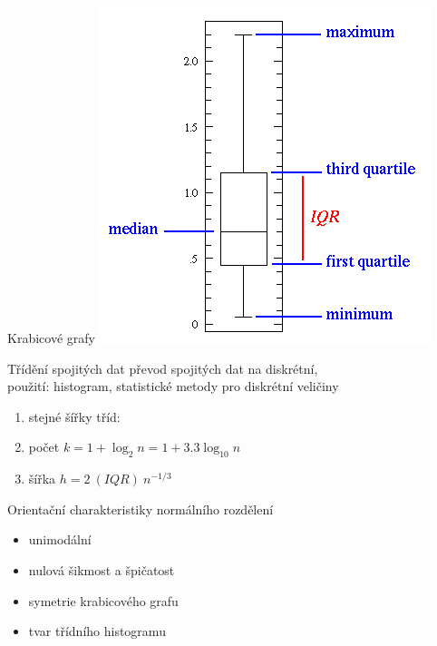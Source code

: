 \documentclass[smaller]{beamer}
\begin{document}
\begin{frame}{Krabicové grafy}
\includegraphics[scale=0.5]{simple_box_defs.png} 
\end{frame}

\begin{frame}{Třídění spojitých dat}
převod spojitých dat na diskrétní,\\
použití: histogram, statistické metody pro diskrétní veličiny
\begin{enumerate}
\item stejné šířky tříd: 
\item počet  $k = 1+\log_2 n=1+3.3 \log_10 n$
\item šířka $h = 2\ (IQR)\ n^{-1/3}$
\end{enumerate}
\end{frame}

\begin{frame}{Orientační charakteristiky normálního rozdělení}
\begin{itemize}
\item unimodální
\item nulová šikmost a špičatost
\item symetrie krabicového grafu
\item tvar třídního histogramu
\end{itemize}
\end{frame}
\end{document}
